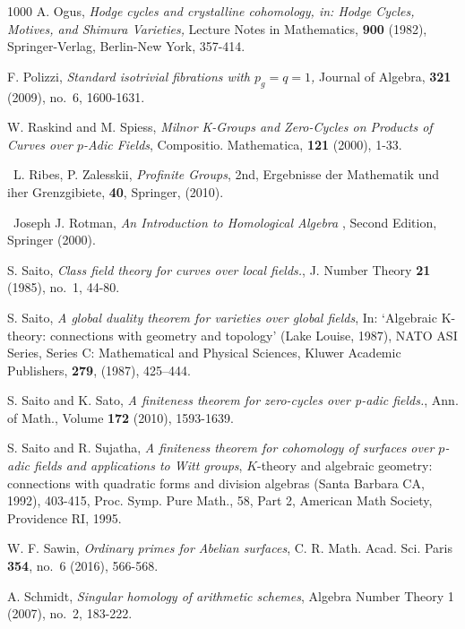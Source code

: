 \documentclass[12pt]{amsart}
\theoremstyle{remark}
\renewcommand{\1}{{\mathbb{S}}}
\newcommand{\<}{\langle}
\renewcommand{\>}{\rangle}
\begin{document}
\begin{thebibliography}{1000}
  A. Ogus,   
{\sl Hodge cycles and crystalline cohomology, in: Hodge Cycles, Motives, and Shimura
Varieties,\/} Lecture Notes in Mathematics, \textbf{900} (1982), Springer-Verlag, Berlin-New York, 357-414.\              

             F. Polizzi,  
{\sl Standard isotrivial fibrations with $p_g=q=1$,\/} Journal of  Algebra, \textbf{321} (2009), no.~6, 1600-1631.\  
		
		 W. Raskind and M. Spiess,  {\sl Milnor K-Groups and Zero-Cycles on Products of
			Curves over $p$-Adic Fields}, Compositio. Mathematica, \textbf{121} (2000), 1-33. \

	\ L. Ribes, P. Zalesskii, {\sl Profinite Groups\/},
		2nd,  Ergebnisse der Mathematik und iher Grenzgibiete, {\bf 40},
		Springer, (2010). \ 


 \  Joseph J. Rotman, {\sl An Introduction to Homological Algebra \/}, Second Edition, Springer (2000).\ 

 S. Saito, {\sl Class field theory for curves over local fields.\/}, J. Number Theory \textbf{21} (1985), no.~1, 44-80. \


 S. Saito, {\sl A global duality theorem for varieties over
    global fields\/}, In: ‘Algebraic K-theory: connections
  with geometry and topology’ (Lake Louise, 1987), NATO ASI Series, Series C:
  Mathematical and
Physical Sciences, Kluwer Academic Publishers, {\bf 279}, (1987), 425--444.\

		
 S. Saito and K. Sato, {\sl A finiteness theorem for zero-cycles over p-adic fields.\/},  Ann. of Math., Volume {\bf 172} (2010), 1593-1639. \

 S. Saito and R. Sujatha, {\sl A finiteness theorem for cohomology of surfaces over $p$-adic fields and applications to Witt groups\/}, $K$-theory and algebraic geometry: connections with quadratic forms and division algebras (Santa Barbara CA, 1992), 403-415, Proc. Symp. Pure Math., 58, Part 2, American Math Society, Providence RI, 1995. \

 W. F. Sawin, {\sl Ordinary primes for Abelian surfaces}, C. R. Math. Acad. Sci. Paris \textbf{354}, no.~6 (2016), 566-568.  \ 



 A. Schmidt, {\sl Singular homology of arithmetic schemes}, Algebra Number Theory 1 (2007), no.~2, 183-222.  \ 


\end{thebibliography}
\end{document}
